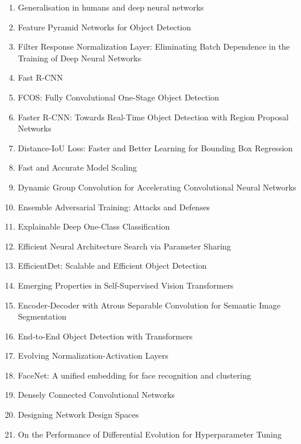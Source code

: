 \documentclass[acmlarge]{acmart}
\begin{document}
\begin{enumerate}
	\item Generalisation in humans and deep neural networks \cite{Geirhos2018GeneralisationIH}
	\item Feature Pyramid Networks for Object Detection \cite{Lin2017FeaturePN}
	\item Filter Response Normalization Layer: Eliminating Batch Dependence in the Training of Deep Neural Networks \cite{Singh2020FilterRN}
	\item Fast R-CNN \cite{Girshick2015FastR}
	\item FCOS: Fully Convolutional One-Stage Object Detection \cite{Tian2019FCOSFC}
	\item Faster R-CNN: Towards Real-Time Object Detection with Region Proposal Networks \cite{Ren2015FasterRT}
	\item Distance-IoU Loss: Faster and Better Learning for Bounding Box Regression \cite{Zheng2020DistanceIoULF}
	\item Fast and Accurate Model Scaling \cite{Dollr2021FastAA}
	\item Dynamic Group Convolution for Accelerating Convolutional Neural Networks \cite{Su2020DynamicGC}
	\item Ensemble Adversarial Training: Attacks and Defenses \cite{Tramr2018EnsembleAT}
	\item Explainable Deep One-Class Classification \cite{Liznerski2021ExplainableDO}
	\item Efficient Neural Architecture Search via Parameter Sharing \cite{Pham2018EfficientNA}
	\item EfficientDet: Scalable and Efficient Object Detection \cite{Tan2020EfficientDetSA}
	\item Emerging Properties in Self-Supervised Vision Transformers \cite{Caron2021EmergingPI}
	\item Encoder-Decoder with Atrous Separable Convolution for Semantic Image Segmentation \cite{Chen2018EncoderDecoderWA}
	\item End-to-End Object Detection with Transformers \cite{Carion2020EndtoEndOD}
	\item Evolving Normalization-Activation Layers \cite{Liu2020EvolvingNL}
	\item FaceNet: A unified embedding for face recognition and clustering \cite{Schroff2015FaceNetAU}
	\item Densely Connected Convolutional Networks \cite{Huang2017DenselyCC}
	\item Designing Network Design Spaces \cite{Radosavovic2020DesigningND}
	\item On the Performance of Differential Evolution for Hyperparameter Tuning \cite{Schmidt2019OnTP}

\end{enumerate}
\end{document}
